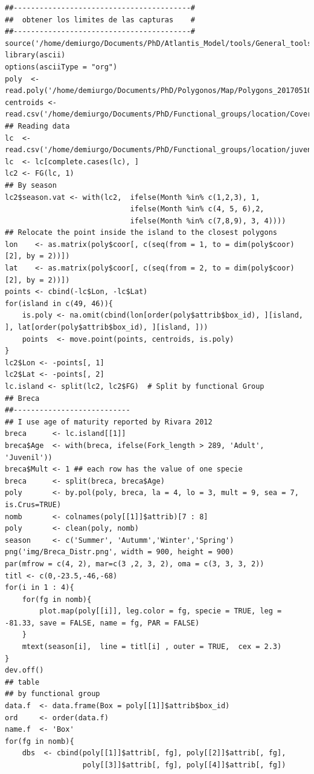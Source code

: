 \documentclass[11pt]{article}
\begin{document}
\begin{itemize}
\begin{itemize}
\begin{itemize}
\begin{verbatim}
##-----------------------------------------#
##  obtener los limites de las capturas    #
##-----------------------------------------#
source('/home/demiurgo/Documents/PhD/Atlantis_Model/tools/General_tools/Atlantis_tools.R')
library(ascii)
options(asciiType = "org")
poly  <- read.poly('/home/demiurgo/Documents/PhD/Polygonos/Map/Polygons_20170510.csv')
centroids <- read.csv('/home/demiurgo/Documents/PhD/Functional_groups/location/Cover/centroids.csv')
## Reading data
lc  <- read.csv('/home/demiurgo/Documents/PhD/Functional_groups/location/juvenils/Breca/Breca_spatial_size.csv')
lc  <- lc[complete.cases(lc), ]
lc2 <- FG(lc, 1)
## By season
lc2$season.vat <- with(lc2,  ifelse(Month %in% c(1,2,3), 1,
                             ifelse(Month %in% c(4, 5, 6),2,
                             ifelse(Month %in% c(7,8,9), 3, 4))))
## Relocate the point inside the island to the closest polygons
lon    <- as.matrix(poly$coor[, c(seq(from = 1, to = dim(poly$coor)[2], by = 2))])
lat    <- as.matrix(poly$coor[, c(seq(from = 2, to = dim(poly$coor)[2], by = 2))])
points <- cbind(-lc$Lon, -lc$Lat)
for(island in c(49, 46)){
    is.poly <- na.omit(cbind(lon[order(poly$attrib$box_id), ][island, ], lat[order(poly$attrib$box_id), ][island, ]))
    points  <- move.point(points, centroids, is.poly)
}
lc2$Lon <- -points[, 1]
lc2$Lat <- -points[, 2]
lc.island <- split(lc2, lc2$FG)  # Split by functional Group
## Breca
##---------------------------
## I use age of maturity reported by Rivara 2012
breca      <- lc.island[[1]]
breca$Age  <- with(breca, ifelse(Fork_length > 289, 'Adult', 'Juvenil'))
breca$Mult <- 1 ## each row has the value of one specie
breca      <- split(breca, breca$Age)
poly       <- by.pol(poly, breca, la = 4, lo = 3, mult = 9, sea = 7, is.Crus=TRUE)
nomb       <- colnames(poly[[1]]$attrib)[7 : 8]
poly       <- clean(poly, nomb)
season     <- c('Summer', 'Autumm','Winter','Spring')
png('img/Breca_Distr.png', width = 900, height = 900)
par(mfrow = c(4, 2), mar=c(3 ,2, 3, 2), oma = c(3, 3, 3, 2))
titl <- c(0,-23.5,-46,-68)
for(i in 1 : 4){
    for(fg in nomb){
        plot.map(poly[[i]], leg.color = fg, specie = TRUE, leg = -81.33, save = FALSE, name = fg, PAR = FALSE)
    }
    mtext(season[i],  line = titl[i] , outer = TRUE,  cex = 2.3)
}
dev.off()
## table
## by functional group
data.f  <- data.frame(Box = poly[[1]]$attrib$box_id)
ord     <- order(data.f)
name.f  <- 'Box'
for(fg in nomb){
    dbs  <- cbind(poly[[1]]$attrib[, fg], poly[[2]]$attrib[, fg],
                  poly[[3]]$attrib[, fg], poly[[4]]$attrib[, fg])

\end{verbatim}
\end{itemize}
\end{itemize}
\end{itemize}
\end{document}
